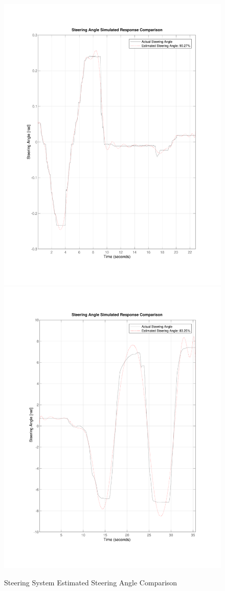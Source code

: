 \documentclass[letterpaper,12pt]{article}   %
\begin{document}
\begin{figure}[h]
	\centering
		{\includegraphics[width=0.48\linewidth]{figs/img/byWireSteeringTransferFunctionModel}}
		{\includegraphics[width=0.48\linewidth]{figs/img/manualSteeringTransferFunctionModel}}
	\caption{Steering System Estimated Steering Angle Comparison}
\end{figure}
\end{document}
